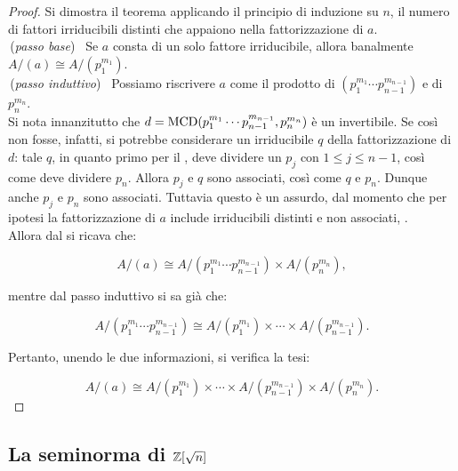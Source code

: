     \begin{proof}
        Si dimostra il teorema applicando il principio di induzione su $n$,
        il numero di fattori irriducibili distinti che appaiono
        nella fattorizzazione di $a$. \\
        
        \,(\textit{passo base}) \, Se $a$ consta di un solo fattore irriducibile,
        allora banalmente $A/(a) \cong A/(p_1^{m_1})$. \\
        
        \,(\textit{passo induttivo}) \, Possiamo riscrivere $a$ come
        il prodotto di $(p_1^{m_1}\cdots p_{n-1}^{m_{n-1}})$ e di
        $p_n^{m_n}$. \\
        
        Si nota innanzitutto che $d = \operatorname{MCD}(p_1^{m_1}\cdots p_{n-1}^{m_{n-1}}, p_n^{m_n})$
        è un invertibile. Se così non fosse, infatti, si potrebbe
        considerare un irriducibile $q$ della fattorizzazione di $d$:
        tale $q$, in quanto primo per il ,
        deve dividere un $p_j$ con $1 \leq j \leq n-1$, così
        come deve dividere $p_n$. Allora $p_j$ e $q$ sono associati,
        così come $q$ e $p_n$. Dunque anche $p_j$ e $p_n$ sono associati.
        Tuttavia questo è un assurdo, dal momento che per ipotesi
        la fattorizzazione di $a$ include irriducibili distinti e
        non associati, \Lightning{}. \\
        
        Allora dal  si ricava che:
        
        \[ A/(a) \cong A/(p_1^{m_1}\cdots p_{n-1}^{m_{n-1}}) \times A/(p_n^{m_n}), \]
        
        \vskip 0.1in
        
        mentre dal passo induttivo si sa già che:
        
        \[ A/(p_1^{m_1}\cdots p_{n-1}^{m_{n-1}}) \cong A/(p_1^{m_1}) \times \cdots \times A/(p_{n-1}^{m_{n-1}}). \]
        
        \vskip 0.1in
        
        Pertanto, unendo le due informazioni, si verifica la tesi:
        
            \[ A/(a) \cong
            A/(p_1^{m_1}) \times \cdots \times A/(p_{n-1}^{m_{n-1}}) \times A/(p_n^{m_n}). \]
        
    \end{proof}

\subsection{La seminorma di \texorpdfstring{$\mathbb Z[\sqrt{n}]$}{Z[√n]}}

